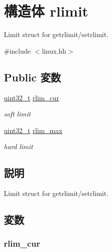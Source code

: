 \hypertarget{structArmLinux32_1_1rlimit}{
\section{構造体 rlimit}
\label{structArmLinux32_1_1rlimit}
}


Limit struct for getrlimit/setrlimit.  


{\ttfamily \#include $<$linux.hh$>$}\subsection*{Public 変数}
\begin{DoxyCompactItemize}
\item 
\hyperlink{Type_8hh_a435d1572bf3f880d55459d9805097f62}{uint32\_\-t} \hyperlink{structArmLinux32_1_1rlimit_ac274d74ea4c4a156aa21ce3b0a4060c2}{rlim\_\-cur}
\begin{DoxyCompactList}\small\item\em soft limit \item\end{DoxyCompactList}\item 
\hyperlink{Type_8hh_a435d1572bf3f880d55459d9805097f62}{uint32\_\-t} \hyperlink{structArmLinux32_1_1rlimit_a09436dd8b2174416e96d0f45243dd6cf}{rlim\_\-max}
\begin{DoxyCompactList}\small\item\em hard limit \item\end{DoxyCompactList}\end{DoxyCompactItemize}


\subsection{説明}
Limit struct for getrlimit/setrlimit. 

\subsection{変数}
\hypertarget{structArmLinux32_1_1rlimit_ac274d74ea4c4a156aa21ce3b0a4060c2}{
\subsubsection[{rlim\_\-cur}]{ {\bf rlim\_\-cur}}}
\label{structArmLinux32_1_1rlimit_ac274d74ea4c4a156aa21ce3b0a4060c2}


